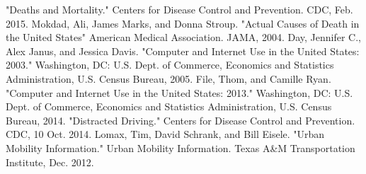 \documentclass[11pt]{article}
\begin{document}
\begin{multicols}{2}
\begin{thebibliography}{9}
"Deaths and Mortality." Centers for Disease Control and Prevention. CDC, Feb. 2015.
Mokdad, Ali, James Marks, and Donna Stroup. "Actual Causes of Death in the United States" American Medical Association. JAMA, 2004.
Day, Jennifer C., Alex Janus, and Jessica Davis. "Computer and Internet Use in the United States: 2003." Washington, DC: U.S. Dept. of Commerce, Economics and Statistics Administration, U.S. Census Bureau, 2005.
File, Thom, and Camille Ryan. "Computer and Internet Use in the United States: 2013." Washington, DC: U.S. Dept. of Commerce, Economics and Statistics Administration, U.S. Census Bureau, 2014.
"Distracted Driving." Centers for Disease Control and Prevention. CDC, 10 Oct. 2014.
Lomax, Tim, David Schrank, and Bill Eisele. "Urban Mobility Information." Urban Mobility Information. Texas A\&M Transportation Institute, Dec. 2012.
\end{thebibliography}

\end{multicols}
\end{document}
